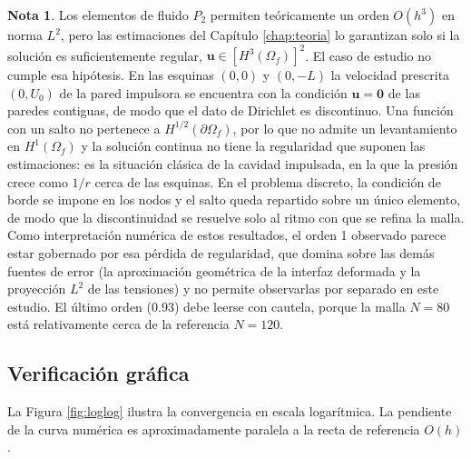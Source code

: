 \documentclass[12pt, letterpaper]{report}
\theoremstyle{definition}
\newtheorem*{nota}{Nota}
\begin{document}
\begin{nota}
	Los elementos de fluido $P_2$ permiten teóricamente un orden $O(h^3)$ en norma $L^2$, pero las estimaciones del Capítulo \ref{chap:teoria} lo garantizan solo si la solución es suficientemente regular, $\mathbf{u} \in [H^3(\Omega_f)]^2$. El caso de estudio no cumple esa hipótesis. En las esquinas $(0, 0)$ y $(0, -L)$ la velocidad prescrita $(0, U_0)$ de la pared impulsora se encuentra con la condición $\mathbf{u} = \mathbf{0}$ de las paredes contiguas, de modo que el dato de Dirichlet es discontinuo. Una función con un salto no pertenece a $H^{1/2}(\partial\Omega_f)$, por lo que no admite un levantamiento en $H^1(\Omega_f)$ y la solución continua no tiene la regularidad que suponen las estimaciones: es la situación clásica de la cavidad impulsada, en la que la presión crece como $1/r$ cerca de las esquinas. En el problema discreto, la condición de borde se impone en los nodos y el salto queda repartido sobre un único elemento, de modo que la discontinuidad se resuelve solo al ritmo con que se refina la malla. Como interpretación numérica de estos resultados, el orden 1 observado parece estar gobernado por esa pérdida de regularidad, que domina sobre las demás fuentes de error (la aproximación geométrica de la interfaz deformada y la proyección $L^2$ de las tensiones) y no permite observarlas por separado en este estudio. El último orden ($0.93$) debe leerse con cautela, porque la malla $N = 80$ está relativamente cerca de la referencia $N = 120$.
\end{nota}

\subsection{Verificación gráfica}

La Figura \ref{fig:loglog} ilustra la convergencia en escala logarítmica. La pendiente de la curva numérica es aproximadamente paralela a la recta de referencia $O(h)$.
\end{document}
